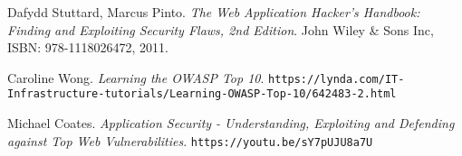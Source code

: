 \documentclass[a4paper]{article}
\begin{document}
\begin{thebibliography}{9}

		Dafydd Stuttard, Marcus Pinto.
		\textit{The Web Application Hacker's Handbook: Finding and Exploiting Security Flaws, 2nd Edition}.
		John Wiley \& Sons Inc, ISBN: 978-1118026472, 2011.

		Caroline Wong.
		\textit{Learning the OWASP Top 10}.
		\texttt{https://lynda.com/IT-\allowbreak{}Infrastructure-tutorials/Learning-OWASP-Top-10/642483-2.html}
		
		Michael Coates.
		\textit{Application Security - Understanding, Exploiting and Defending against Top Web Vulnerabilities}.
		\texttt{https://youtu.be/sY7pUJU8a7U}
\end{thebibliography}
\end{document}
